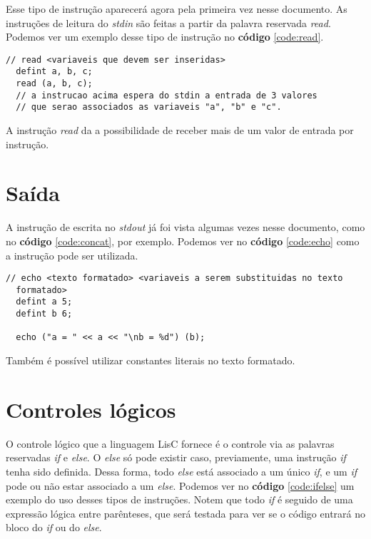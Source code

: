 \documentclass[
  12pt,				%
  oneside,			%
  a4paper,			%
  english,			%
  french,				%
  spanish,			%
  brazil,				%
]{abntex2}
\begin{document}
Esse tipo de instrução aparecerá agora pela primeira vez nesse
documento. As instruções de leitura do \emph{stdin} são feitas a
partir da palavra reservada \emph{read}. Podemos ver um exemplo desse
tipo de instrução no \textbf{código} \ref{code:read}.

\begin{lstlisting}[label=code:read,caption=Exemplo de código da
  instrução read.]
  // read <variaveis que devem ser inseridas>
  defint a, b, c;
  read (a, b, c);
  // a instrucao acima espera do stdin a entrada de 3 valores
  // que serao associados as variaveis "a", "b" e "c".
\end{lstlisting}
A instrução \emph{read} da a possibilidade de receber mais de um valor
de entrada por instrução.

\section{Saída}
\label{sec:saida}

A instrução de escrita no \emph{stdout} já foi vista algumas vezes
nesse documento, como no \textbf{código} \ref{code:concat}, por
exemplo. Podemos ver no \textbf{código} \ref{code:echo} como a
instrução pode ser utilizada.

\begin{lstlisting}[label=code:echo,caption=Exemplo de código da
  instrução echo]
  // echo <texto formatado> <variaveis a serem substituidas no texto
  formatado>
  defint a 5;
  defint b 6;
  
  echo ("a = " << a << "\nb = %d") (b);
\end{lstlisting}

Também é possível utilizar constantes literais no texto formatado.

\section{Controles lógicos}
\label{sec:controles-logicos}

O controle lógico que a linguagem LisC fornece é o controle via as
palavras reservadas \emph{if} e \emph{else}. O \emph{else} só pode
existir caso, previamente, uma instrução \emph{if} tenha sido
definida. Dessa forma, todo \emph{else} está associado a um único
\emph{if}, e um \emph{if} pode ou não estar associado a um
\emph{else}. Podemos ver no \textbf{código} \ref{code:ifelse} um
exemplo do uso desses tipos de instruções. Notem que todo \emph{if} é
seguido de uma expressão lógica entre parênteses, que será testada
para ver se o código entrará no bloco do \emph{if} ou do \emph{else}.
\end{document}
